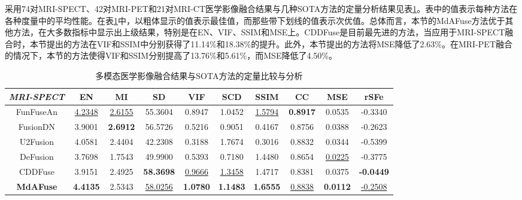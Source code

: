 采用74对MRI-SPECT、42对MRI-PET和21对MRI-CT医学影像融合结果与几种SOTA方法的定量分析结果见表\ref{paper2quantitativeMetrics}。表中的值表示每种方法在各种度量中的平均性能。在表\ref{paper2quantitativeMetrics}中，以粗体显示的值表示最佳值，而那些带下划线的值表示次优值。总体而言，本节的MdAFuse方法优于其他方法，在大多数指标中显示出上级结果，特别是在EN、VIF、SSIM和MSE上。CDDFuse是目前最先进的方法，当应用于MRI-SPECT融合时，本节提出的方法在VIF和SSIM中分别获得了11.14\%和18.38\%的提升。此外，本节提出的方法将MSE降低了2.63\%。在MRI-PET融合的情况下，本节的方法使得VIF和SSIM分别提高了13.76\%和5.61\%，而MSE降低了4.50\%。

\begin{table}[htb]
\centering
  \caption{多模态医学影像融合结果与SOTA方法的定量比较与分析}\label{paper2quantitativeMetrics}
  \scriptsize
\begin{tabular}{cccccccccc}
\hline

\textit{MRI-SPECT} & \textbf{EN}     & \textbf{MI}     & \textbf{SD}      & \textbf{VIF}   & \textbf{SCD}    & \textbf{SSIM}   & \textbf{CC}     & \textbf{MSE}    & \textbf{rSFe}    \\ \hline
FunFuseAn                  & \underline{4.2348}    & \underline{2.6155}          & 55.3604          & 0.8947          & 1.0452          & \underline{ 1.5794}    & \textbf{0.8917} & 0.0535          & -0.3340          \\
FusionDN                  & 3.9001          & \textbf{2.6912} & 56.5726          & 0.5216          & 0.9051          & 0.4167          & 0.8756          & 0.0388          & -0.2623          \\
U2Fusion                        & 4.0581          & 2.4404          & 42.2308          & 0.3188          & 1.7674          & 0.3016          & 0.8832          & 0.0344          & -0.5399          \\
DeFusion                       & 3.7698          & 1.7543          & 49.9900          & 0.5393          & 0.7180          & 1.4480          & 0.8654          & \underline{ 0.0225}    & -0.3775          \\
CDDFuse                    & 3.9151          & 2.4925          & \textbf{58.3698} & \underline{ 0.9666}    & \underline{ 1.3458}    & 1.4717          & 0.8381          & 0.0375          & \textbf{-0.0449} \\
\textbf{MdAFuse}                    & \textbf{4.4135} & 2.5343    & \underline{ 58.0256}    & \textbf{1.0780} & \textbf{1.1483} & \textbf{1.6555} & \underline{ 0.8838}    & \textbf{0.0112} & \underline{ -0.2508}    \\ \hline


\end{tabular}
\end{table}
